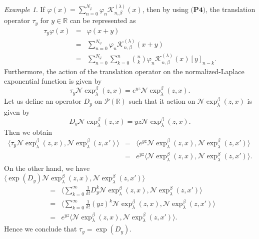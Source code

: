 \documentclass{birkjour}
\theoremstyle{definition}
\theoremstyle{remark}
\newtheorem*{ex}{Example}
\numberwithin{equation}{section}
\begin{document}
\begin{ex}
If $\varphi(x)=
\displaystyle{\sum^{N_{\varphi}}_{n=0}\varphi_{n}\mathcal{K}^{(\lambda)}_{n,
\beta}(x)}$, then by using $\textbf{(P4)}$, the translation operator
$\tau_{y}$ for $y\in \mathbb{R}$ can be represented as
$$\begin{array}{lll}
\tau_{y}\varphi(x)&=&\varphi(x+y)\\
&=&\displaystyle{\sum^{N_{\varphi}}_{n=0}\varphi_{n}\mathcal{K}^{(\lambda)}_{n,
\beta}(x+y)}\\
&=&\displaystyle{\sum^{N_{\varphi}}_{n=0}\sum^{n}_{k=0}\binom{n}{k}\varphi_{n}\mathcal{K}^{(\lambda)}_{n,
\beta}(x)[y]_{n-k}}.
\end{array}$$
Furthermore, the action of the translation operator on the
normalized-Laplace exponential function is given by
$$\tau_{y}\mathcal{N}\exp^{\beta}_{\lambda}(z, x)=e^{yz}\mathcal{N}\exp^{\beta}_{\lambda}(z, x).$$
Let us define an operator $D_{y}$ on $\mathcal{P}(\mathbb{R})$ such
that it action on $\mathcal{N}\exp^{\beta}_{\lambda}(z, x)$ is given
by
$$D_{y}\mathcal{N}\exp^{\beta}_{\lambda}(z, x)=yz\mathcal{N}\exp^{\beta}_{\lambda}(z, x).$$
Then we obtain
$$\begin{array}{lll}
\big\langle\tau_{y}\mathcal{N}\exp^{\beta}_{\lambda}(z, x),
\mathcal{N}\exp^{\beta}_{\lambda}(z, x')\big\rangle&=&\big\langle
e^{yz}\mathcal{N}\exp^{\beta}_{\lambda}(z, x),
\mathcal{N}\exp^{\beta}_{\lambda}(z, x')\big\rangle\\
&=&e^{yz}\big\langle\mathcal{N}\exp^{\beta}_{\lambda}(z, x),
\mathcal{N}\exp^{\beta}_{\lambda}(z, x')\big\rangle.
\end{array}$$
On the other hand, we have\\

$\big\langle\exp(D_{y})\mathcal{N}\exp^{\beta}_{\lambda}(z, x),
\mathcal{N}\exp^{\beta}_{\lambda}(z, x')\big\rangle$
$$\begin{array}{lll}
&=&\displaystyle{\Big\langle
\sum^{\infty}_{k=0}\frac{1}{k!}D^{k}_{y}\mathcal{N}\exp^{\beta}_{\lambda}(z,
x),
\mathcal{N}\exp^{\beta}_{\lambda}(z, x')\Big\rangle}\\
&=&\displaystyle{\Big\langle
\sum^{\infty}_{k=0}\frac{1}{k!}(yz)^{k}\mathcal{N}\exp^{\beta}_{\lambda}(z,
x),
\mathcal{N}\exp^{\beta}_{\lambda}(z, x')\Big\rangle}\\
&=&e^{yz}\langle\mathcal{N}\exp^{\beta}_{\lambda}(z, x),
\mathcal{N}\exp^{\beta}_{\lambda}(z, x')\rangle.
\end{array}$$
Hence we conclude that $\tau_{y}=\exp(D_{y})$.
\end{ex}
\end{document}
